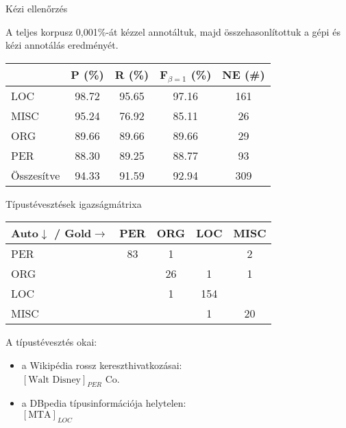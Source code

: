 \documentclass[utf8x,t]{beamer}
\begin{document}
\begin{frame}{Kézi ellenőrzés}

\bigskip

A teljes korpusz 0,001\%-át kézzel annotáltuk, majd összehasonlítottuk a gépi és kézi annotálás eredményét.

\bigskip

\begin{center}
\begin{tabular}{lcccc}
\toprule
& P (\%) &  R (\%) & F$_{\beta=1}$ (\%) & NE (\#) \\
\midrule
LOC     &   98.72 &  95.65 &  97.16 & 161 \\
MISC    &   95.24 &  76.92 &  85.11 & 26 \\
ORG     &   89.66 &  89.66 &  89.66 & 29 \\
PER     &   88.30 &  89.25 &  88.77 & 93 \\
\midrule
Összesítve &   94.33 &  91.59 &  92.94 & 309 \\
\bottomrule
\end{tabular} 
\end{center}

\end{frame}

\begin{frame}{Típustévesztések igazságmátrixa}

\bigskip

\begin{center}
\begin{tabular}{l@{\hspace{0.5em}}|@{\hspace{0.5em}}cccc}
\toprule
Auto$\downarrow$ / Gold$\rightarrow$ & PER & ORG & LOC & MISC \\
\midrule
PER & 83 & 1 & & 2 \\
ORG &  & 26 & 1 & 1 \\
LOC &  & 1 & 154 & \\
MISC &  &  & 1 & 20 \\
\bottomrule
\end{tabular}
\end{center}

\bigskip

A típustévesztés okai:

\begin{itemize}
\item a Wikipédia rossz kereszthivatkozásai: \\ $[\mbox{Walt Disney}]_{PER}$ Co.
\item a DBpedia típusinformációja helytelen: \\ $[\mbox{MTA}]_{LOC}$
\end{itemize}

\end{frame}
\end{document}

